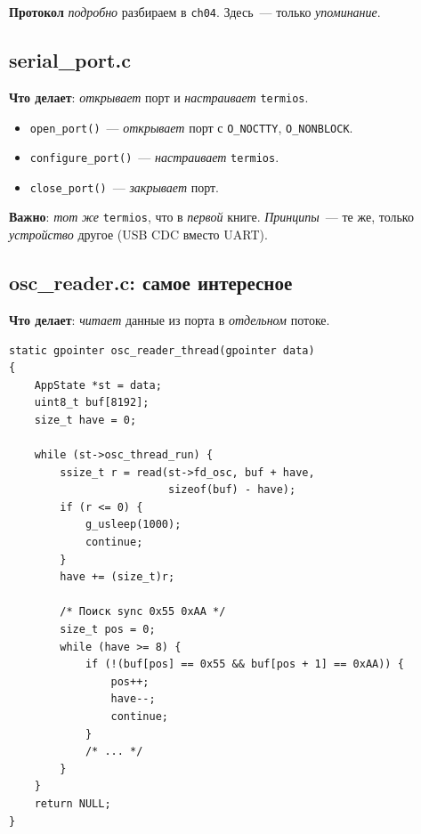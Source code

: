 \begin{notebox}
\textbf{Протокол} \emph{подробно} разбираем в
\texttt{ch04}. Здесь~--- только \emph{упоминание}.
\end{notebox}

\subsection{serial\_port.c}

\textbf{Что делает}: \emph{открывает} порт и
\emph{настраивает} \texttt{termios}.

\begin{itemize}
    \item \texttt{open\_port()}~--- \emph{открывает}
          порт с \texttt{O\_NOCTTY}, \texttt{O\_NONBLOCK}.
    \item \texttt{configure\_port()}~--- \emph{настраивает}
          \texttt{termios}.
    \item \texttt{close\_port()}~--- \emph{закрывает} порт.
\end{itemize}

\textbf{Важно}: \emph{тот} \emph{же} \texttt{termios}, что
в \emph{первой} книге. \emph{Принципы}~--- те же, только
\emph{устройство} другое (USB CDC вместо UART).

\subsection{osc\_reader.c: самое интересное}

\textbf{Что делает}: \emph{читает} данные из порта
в \emph{отдельном} потоке.

\begin{listing}[htbp]
\begin{verbatim}
static gpointer osc_reader_thread(gpointer data)
{
    AppState *st = data;
    uint8_t buf[8192];
    size_t have = 0;

    while (st->osc_thread_run) {
        ssize_t r = read(st->fd_osc, buf + have,
                         sizeof(buf) - have);
        if (r <= 0) {
            g_usleep(1000);
            continue;
        }
        have += (size_t)r;

        /* Поиск sync 0x55 0xAA */
        size_t pos = 0;
        while (have >= 8) {
            if (!(buf[pos] == 0x55 && buf[pos + 1] == 0xAA)) {
                pos++;
                have--;
                continue;
            }
            /* ... */
        }
    }
    return NULL;
}
\end{verbatim}
\caption{Поток чтения осциллографа}
\label{lst:arch-osc-reader}
\end{listing}

